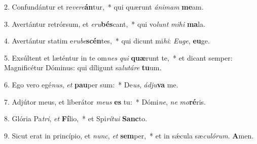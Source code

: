 2. Confundántur et re\textit{ve}\textit{re}\textbf{án}tur,~*  qui quærunt \textit{á}\textit{ni}\textit{mam} \textbf{me}am.\

3. Avertántur retrórsum, et \textit{e}\textit{ru}\textbf{bés}cant,~*  qui vo\textit{lunt} \textit{mi}\textit{hi} \textbf{ma}la.\

4. Avertántur statim e\textit{ru}\textit{be}\textbf{scén}tes,~*  qui dicunt mi\textit{hi}: \textit{Eu}\textit{ge}, \textbf{eu}ge.\

5. Exsúltent et læténtur in te om\textit{nes} \textit{qui} \textbf{quæ}runt te,~*  et dicant semper: Magnificétur Dóminus: qui díligunt sa\textit{lu}\textit{tá}\textit{re} \textbf{tu}um.\

6. Ego vero egé\textit{nus}, \textit{et} \textbf{pau}per sum:~*  De\textit{us}, \textit{ád}\textit{ju}\textbf{va} me.\

7. Adjútor meus, et liberátor \textit{me}\textit{us} \textbf{es} tu:~*  Dómi\textit{ne}, \textit{ne} \textit{mo}\textbf{ré}ris.\

8. Glória Pa\textit{tri}, \textit{et} \textbf{Fí}lio,~*  et Spi\textit{rí}\textit{tu}\textit{i} \textbf{Sanc}to.\

9. Sicut erat in princípio, et \textit{nunc}, \textit{et} \textbf{sem}per,~*  et in sǽcula sæ\textit{cu}\textit{ló}\textit{rum}. \textbf{A}men.\

